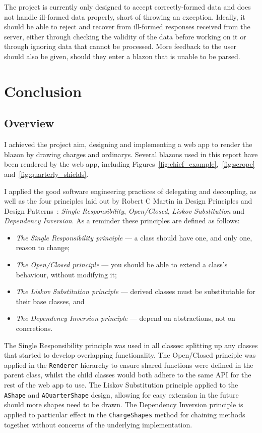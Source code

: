 \documentclass[nobib, a4paper, twoside, justified]{tufte-book}
\makeatletter
\newcommand{\charges}{\glspl{charge}\@\xspace}
\newcommand{\blazon}{\gls{blazon}\@\xspace}
\makeatother
\begin{document}
The project is currently only designed to accept correctly-formed data and does not handle
ill-formed data properly, short of throwing an exception. Ideally, it should be able to reject and
recover from ill-formed responses received from the server, either through checking the validity of the data
before working on it or through ignoring data that cannot be processed. More feedback to the user
should also be given, should they enter a blazon that is unable to be parsed.

\chapter{Conclusion}%
\label{cha:conclusion}

\section{Overview}%
\label{sec:overview}

I achieved the project aim, designing and implementing a web app to render the \blazon by
drawing \charges and \glspl{ordinary}. Several blazons used in this report have been rendered by
the web app, including Figures~\ref{fig:chief_example},~\ref{fig:scrope}
and~\ref{fig:quarterly_shields}.

I applied the good software engineering practices of delegating and decoupling, as well as the four
principles laid out by Robert C Martin in Design Principles and Design
Patterns~\autocite{martin2000design}: \textit{Single Responsibility}, \textit{Open/Closed},
\textit{Liskov Substitution} and \textit{Dependency Inversion}. As a reminder these principles are
defined as follows:

\begin{itemize}
  \item \textit{The Single Responsibility principle} --- a class should have one, and only one,
    reason to change;
  \item \textit{The Open/Closed principle} --- you should be able to extend a class's behaviour,
    without modifying it;
  \item \textit{The Liskov Substitution principle} --- derived classes must be substitutable for
    their base classes, and
  \item \textit{The Dependency Inversion principle} --- depend on abstractions, not on concretions.
\end{itemize}

The Single Responsibility principle was used in all classes: splitting up any classes that started
to develop overlapping functionality. The Open/Closed principle was applied in the
\texttt{Renderer} hierarchy to ensure shared functions were defined in the parent class, whilst the
child classes would both adhere to the same API for the rest of the web app to use. The Liskov
Substitution principle applied to the \texttt{AShape} and \texttt{AQuarterShape} design, allowing
for easy extension in the future should more shapes need to be drawn. The Dependency Inversion
principle is applied to particular effect in the \texttt{ChargeShapes} method for chaining methods
together without concerns of the underlying implementation.
\end{document}
